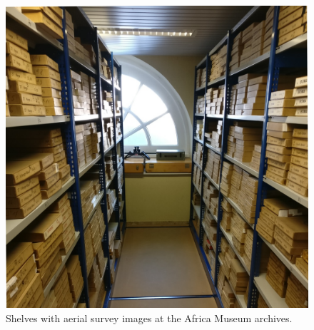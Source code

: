 \documentclass[landscape]{article}
\begin{document}
\begin{figure}

{\centering \includegraphics[width=14.39in,height=0.75\textheight]{./figures/archives_aerial_photos_2} 

}

\caption{Shelves with aerial survey images at the Africa Museum archives.}\label{fig:unnamed-chunk-5}
\end{figure}
\end{document}

